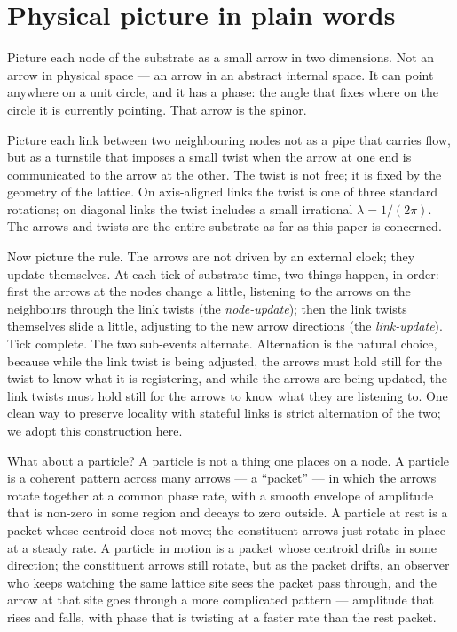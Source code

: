 \documentclass[11pt,a4paper]{article}
\begin{document}
\section{Physical picture in plain words}
\label{sec:picture}

Picture each node of the substrate as a small arrow in two
dimensions. Not an arrow in physical space --- an arrow in an
abstract internal space. It can point anywhere on a unit
circle, and it has a phase: the angle that fixes where on the
circle it is currently pointing. That arrow is the spinor.

Picture each link between two neighbouring nodes not as a pipe
that carries flow, but as a turnstile that imposes a small
twist when the arrow at one end is communicated to the arrow
at the other. The twist is not free; it is fixed by the
geometry of the lattice. On axis-aligned links the twist is one
of three standard rotations; on diagonal links the twist
includes a small irrational $\lambda = 1/(2\pi)$. The
arrows-and-twists are the entire substrate as far as this
paper is concerned.

Now picture the rule. The arrows are not driven by an external
clock; they update themselves. At each tick of substrate time,
two things happen, in order: first the arrows at the nodes
change a little, listening to the arrows on the neighbours
through the link twists (the \emph{node-update}); then the
link twists themselves slide a little, adjusting to the new
arrow directions (the \emph{link-update}). Tick complete. The
two sub-events alternate. Alternation is the natural choice, because while
the link twist is being adjusted, the arrows must hold still
for the twist to know what it is registering, and while the
arrows are being updated, the link twists must hold still for
the arrows to know what they are listening to. One clean way to preserve locality with stateful links is
strict alternation of the two; we adopt this construction here.

What about a particle? A particle is not a thing one places on
a node. A particle is a coherent pattern across many arrows --- a
``packet'' --- in which the arrows rotate together at a common
phase rate, with a smooth envelope of amplitude that is
non-zero in some region and decays to zero outside. A particle
at rest is a packet whose centroid does not move; the
constituent arrows just rotate in place at a steady rate. A
particle in motion is a packet whose centroid drifts in some
direction; the constituent arrows still rotate, but as the
packet drifts, an observer who keeps watching the same lattice
site sees the packet pass through, and the arrow at that site
goes through a more complicated pattern --- amplitude that
rises and falls, with phase that is twisting at a faster rate
than the rest packet.
\end{document}
